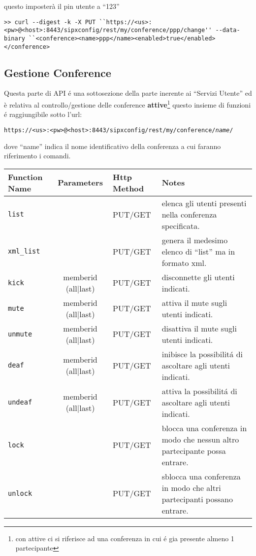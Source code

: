 questo imposter\`a il pin utente a ``123''
\bigskip
\begin{lstlisting}
>> curl --digest -k -X PUT ``https://<us>:<pw>@<host>:8443/sipxconfig/rest/my/conference/ppp/change'' --data-binary ``<conference><name>ppp</name><enabled>true</enabled></conference>
\end{lstlisting}

\subsection{Gestione Conference}

Questa parte di API \'e una sottosezione della parte inerente ai ``Servizi Utente'' ed \`e relativa al controllo/gestione delle conference 
\textbf{attive}\footnote{con attive ci si riferisce ad una conferenza in cui \'e gia presente almeno 1 partecipante}
questo insieme di funzioni \'e raggiungibile sotto l'url:

\bigskip

\texttt{https://<us>:<pw>@<host>:8443/sipxconfig/rest/my/conference/\emph{name}/}

dove ``name'' indica il nome identificativo della conferenza a cui faranno riferimento i comandi.

\bigskip

\begin{tabular}[c]{l | c || l || p{5cm}}
Function Name & Parameters & Http Method & Notes \\
\hline \hline
\texttt{list} & & PUT/GET & elenca gli utenti presenti nella conferenza specificata.\\ \hline
\texttt{xml\_list} & & PUT/GET & genera il medesimo elenco di ``list'' ma in formato xml. \\ \hline
\texttt{kick} & memberid (all|last) & PUT/GET & disconnette gli utenti indicati. \\ \hline
\texttt{mute} & memberid (all|last) & PUT/GET & attiva il mute sugli utenti indicati. \\ \hline
\texttt{unmute} & memberid (all|last) & PUT/GET & disattiva il mute sugli utenti indicati. \\ \hline
\texttt{deaf} & memberid (all|last) & PUT/GET & inibisce la possibilit\'a di ascoltare agli utenti indicati. \\ \hline
\texttt{undeaf} & memberid (all|last) & PUT/GET & attiva la possibilit\'a di ascoltare agli utenti indicati. \\ \hline
\texttt{lock} & & PUT/GET & blocca una conferenza in modo che nessun altro partecipante possa entrare. \\ \hline
\texttt{unlock} & & PUT/GET & sblocca una conferenza in modo che altri partecipanti possano entrare. \\ \hline
\end{tabular}


